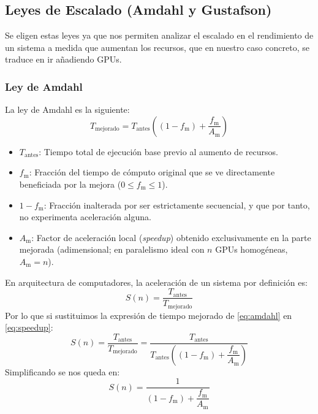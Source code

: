 \documentclass[a4paper,11pt]{article}
\begin{document}
\subsection{Leyes de Escalado (Amdahl y Gustafson)}

Se eligen estas leyes ya que nos permiten analizar el escalado en el rendimiento de un sistema a medida que aumentan los recursos, que
en nuestro caso concreto, se traduce en ir añadiendo GPUs.

\subsubsection*{Ley de Amdahl}

La ley de Amdahl es la siguiente:
\begin{equation}\label{eq:amdahl}
    T_{\text{mejorado}} = T_{\text{antes}} \left( (1 - f_{\text{m}}) + \frac{f_{\text{m}}}{A_{\text{m}}} \right)
\end{equation}
\begin{itemize}[leftmargin=*,noitemsep,topsep=2pt]
    \item $T_{\text{antes}}$: Tiempo total de ejecución base previo al aumento de recursos.
    \item $f_{\text{m}}$: Fracción del tiempo de cómputo original que se ve directamente beneficiada por la mejora ($0 \le f_{\text{m}} \le 1$).
    \item $1 - f_{\text{m}}$: Fracción inalterada por ser estrictamente secuencial, y que por tanto,
    no experimenta aceleración alguna.
    \item $A_{\text{m}}$: Factor de aceleración local (\textit{speedup}) obtenido exclusivamente en la parte 
    mejorada (adimensional; en paralelismo ideal con $n$ GPUs homogéneas, $A_{\text{m}} = n$).
\end{itemize}

En arquitectura de computadores, la aceleración de un sistema por definición es:
\begin{equation}\label{eq:speedup}
    S(n) = \frac{T_{\text{antes}}}{T_{\text{mejorado}}}
\end{equation}
Por lo que si sustituimos la expresión de tiempo mejorado de \eqref{eq:amdahl} en \eqref{eq:speedup}:
\begin{equation}
    S(n) = \frac{T_{\text{antes}}}{T_{\text{mejorado}}}
         = \frac{T_{\text{antes}}}{T_{\text{antes}} \left( (1 - f_{\text{m}}) + \dfrac{f_{\text{m}}}{A_{\text{m}}} \right)}
\end{equation}
Simplificando se nos queda en:
\begin{equation}\label{eq:amdahl_speedup}
    S(n) = \frac{1}{(1 - f_{\text{m}}) + \dfrac{f_{\text{m}}}{A_{\text{m}}}}
\end{equation}
\end{document}
